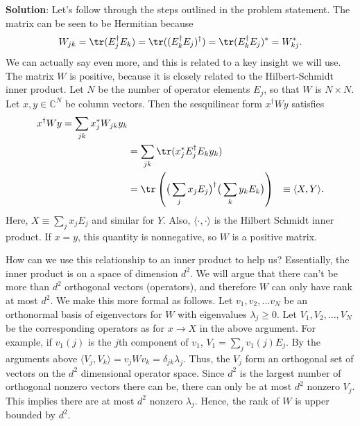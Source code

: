 \documentclass{book}
\begin{document}
    \textbf{Solution}: Let's follow through the steps outlined in the problem statement. The matrix can be seen to be Hermitian because
    \begin{align}
        W_{jk} = \tr( E_j^\dagger E_k) = \tr((E_k^\dagger E_j)^\dagger) = \tr(E_k^\dagger E_j)^* = W_{kj}^*.
    \end{align}
    We can actually say even more, and this is related to a key insight we will use. The matrix $W$ is positive, because it is closely related to the Hilbert-Schmidt inner product. Let $N$ be the number of operator elements $E_j$, so that $W$ is $N\times N$. Let $x, y \in \mathbb{C}^N$ be column vectors. Then the sesquilinear form $x^\dagger W y$ satisfies
    \begin{align}
        x^\dagger W y = \sum_{jk} x_j^* W_{jk} y_k \\
        &= \sum_{jk} \tr(x_j^* E_j^\dagger E_k y_k) \\
        &= \tr\left(\big(\sum_j x_j E_j\big)^\dagger \big(\sum_k y_k E_k\big)\right)
        &\equiv \langle X, Y\rangle.
    \end{align}
    Here, $X \equiv \sum_j x_j E_j$ and similar for $Y$. Also, $\langle\cdot , \cdot \rangle$ is the Hilbert Schmidt inner product. If $x = y$, this quantity is nonnegative, so $W$ is a positive matrix.

    How can we use this relationship to an inner product to help us? Essentially, the inner product is on a space of dimension $d^2$. We will argue that there can't be more than $d^2$ orthogonal vectors (operators), and therefore $W$ can only have rank at most $d^2$. We make this more formal as follows. Let $v_1, v_2, \dots v_N$ be an orthonormal basis of eigenvectors for $W$ with eigenvalues $\lambda_j \geq 0$. Let $V_1, V_2, \dots, V_N$ be the corresponding operators as for $x \rightarrow X$ in the above argument. For example, if $v_1(j)$ is the $j$th component of $v_1$, $V_1 = \sum_j v_1(j) E_j$. By the arguments above $\langle V_j, V_k\rangle = v_j W v_k = \delta_{jk} \lambda_j$. Thus, the $V_j$ form an orthogonal set of vectors on the $d^2$ dimensional operator space. Since $d^2$ is the largest number of orthogonal nonzero vectors there can be, there can only be at most $d^2$ nonzero $V_j$. This implies there are at most $d^2$ nonzero $\lambda_j$. Hence, the rank of $W$ is upper bounded by $d^2$.
\end{document}
